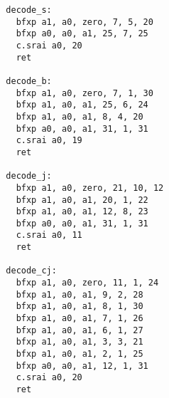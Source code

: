 \begin{multicols}{2}
\begin{verbatim}
  decode_s:
    bfxp a1, a0, zero, 7, 5, 20
    bfxp a0, a0, a1, 25, 7, 25
    c.srai a0, 20
    ret

  decode_b:
    bfxp a1, a0, zero, 7, 1, 30
    bfxp a1, a0, a1, 25, 6, 24
    bfxp a1, a0, a1, 8, 4, 20
    bfxp a0, a0, a1, 31, 1, 31
    c.srai a0, 19
    ret

  decode_j:
    bfxp a1, a0, zero, 21, 10, 12
    bfxp a1, a0, a1, 20, 1, 22
    bfxp a1, a0, a1, 12, 8, 23
    bfxp a0, a0, a1, 31, 1, 31
    c.srai a0, 11
    ret

  decode_cj:
    bfxp a1, a0, zero, 11, 1, 24
    bfxp a1, a0, a1, 9, 2, 28
    bfxp a1, a0, a1, 8, 1, 30
    bfxp a1, a0, a1, 7, 1, 26
    bfxp a1, a0, a1, 6, 1, 27
    bfxp a1, a0, a1, 3, 3, 21
    bfxp a1, a0, a1, 2, 1, 25
    bfxp a0, a0, a1, 12, 1, 31
    c.srai a0, 20
    ret
\end{verbatim}
\end{multicols}
